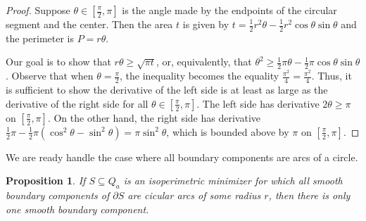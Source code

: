 \documentclass[leqno]{article}
\numberwithin{equation}{section}
\theoremstyle{definition}
\theoremstyle{remark}
\theoremstyle{plain}
\newtheorem{proposition}[equation]{Proposition}
\begin{document}
\begin{proof}
Suppose $\theta\in [\tfrac{\pi}{2},\pi]$ is the angle made by the endpoints of the circular segment and the center.  Then the area $t$ is given by $t = \tfrac{1}{2} r^2\theta -\tfrac{1}{2} r^2\cos\theta \sin\theta$ and the perimeter is $P = r\theta$.

Our goal is to show that $r\theta \geq \sqrt{\pi t}$, or, equivalently, that $\theta^2 \geq \frac{1}{2} \pi \theta - \frac{1}{2}\pi \cos\theta\sin\theta$.  Observe that when $\theta = \tfrac{\pi}{2}$, the inequality becomes the equality $\frac{\pi^2}{4} = \frac{\pi^2}{4}$.  Thus, it is sufficient to show the derivative of the left side is at least as large as the derivative of the right side for all $\theta \in [\tfrac{\pi}{2},\pi]$. The left side has derivative $2\theta \geq \pi$ on $[\tfrac{\pi}{2},\pi]$. On the other hand, the right side has derivative $\frac{1}{2}\pi - \frac{1}{2}\pi (\cos^2\theta - \sin^2\theta) = \pi \sin^2\theta$, which is bounded above by $\pi$ on $[\tfrac{\pi}{2},\pi]$.

\end{proof}

We are ready handle the case where all boundary components are arcs of a circle.

\begin{proposition} If $S\subseteq Q_a$ is an isoperimetric minimizer for which all smooth boundary components of $\partial S$ are cicular arcs of some radius $r$, then there is only one smooth boundary component.
\end{proposition}
\end{document}
